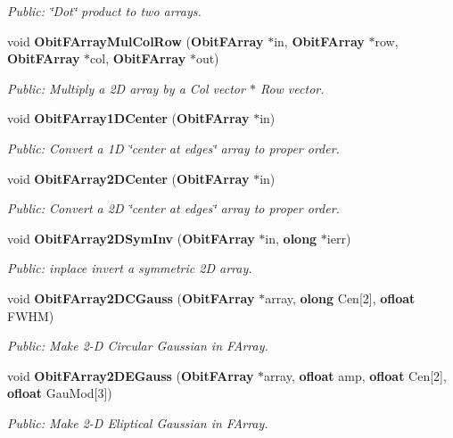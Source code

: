 \begin{CompactItemize}
\begin{CompactList}\small\item\em Public: \char`\"{}Dot\char`\"{} product to two arrays. \item\end{CompactList}\item 
void {\bf Obit\-FArray\-Mul\-Col\-Row} ({\bf Obit\-FArray} $\ast$in, {\bf Obit\-FArray} $\ast$row, {\bf Obit\-FArray} $\ast$col, {\bf Obit\-FArray} $\ast$out)
\begin{CompactList}\small\item\em Public: Multiply a 2D array by a Col vector $\ast$ Row vector. \item\end{CompactList}\item 
void {\bf Obit\-FArray1DCenter} ({\bf Obit\-FArray} $\ast$in)
\begin{CompactList}\small\item\em Public: Convert a 1D \char`\"{}center at edges\char`\"{} array to proper order. \item\end{CompactList}\item 
void {\bf Obit\-FArray2DCenter} ({\bf Obit\-FArray} $\ast$in)
\begin{CompactList}\small\item\em Public: Convert a 2D \char`\"{}center at edges\char`\"{} array to proper order. \item\end{CompactList}\item 
void {\bf Obit\-FArray2DSym\-Inv} ({\bf Obit\-FArray} $\ast$in, {\bf olong} $\ast$ierr)
\begin{CompactList}\small\item\em Public: inplace invert a symmetric 2D array. \item\end{CompactList}\item 
void {\bf Obit\-FArray2DCGauss} ({\bf Obit\-FArray} $\ast$array, {\bf olong} Cen[2], {\bf ofloat} FWHM)
\begin{CompactList}\small\item\em Public: Make 2-D Circular Gaussian in FArray. \item\end{CompactList}\item 
void {\bf Obit\-FArray2DEGauss} ({\bf Obit\-FArray} $\ast$array, {\bf ofloat} amp, {\bf ofloat} Cen[2], {\bf ofloat} Gau\-Mod[3])
\begin{CompactList}\small\item\em Public: Make 2-D Eliptical Gaussian in FArray. \item\end{CompactList}\item 

\end{CompactItemize}
